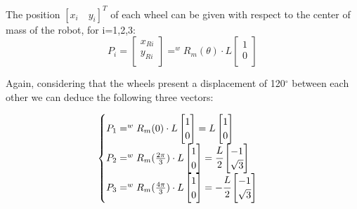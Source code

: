 The position $[x_i\quad y_i]^T$ of each wheel can be given with respect to the center of mass of the robot, for i=1,2,3:
\begin{equation}
P_i = 	\begin{bmatrix}
x_{Ri}\\
y_{Ri}\\
\end{bmatrix} = 
^wR_m(\theta)\cdot L
\begin{bmatrix}
1\\
0\\
\end{bmatrix}
\end{equation}

Again, considering that the wheels present a displacement of 120$^\circ$ between each other we can deduce the following three vectors:

\begin{equation}
\begin{cases} 
P_1 = 	
^wR_m(0)\cdot L
\begin{bmatrix}
1\\
0\\
\end{bmatrix} =
L
\begin{bmatrix}
1\\
0\\
\end{bmatrix}
\\ 
P_2 = 	
^wR_m(\frac{2\pi}{3})\cdot L
\begin{bmatrix}
1\\
0\\
\end{bmatrix} =
\cfrac{L}{2}
\begin{bmatrix}
-1\\
\sqrt{3}\\
\end{bmatrix}
\\ 
P_3 = 	
^wR_m(\frac{4\pi}{3})\cdot L
\begin{bmatrix}
1\\
0\\
\end{bmatrix} =
-\cfrac{L}{2}
\begin{bmatrix}
-1\\
\sqrt{3}\\
\end{bmatrix}
\\ 
\end{cases} 
\end{equation}

